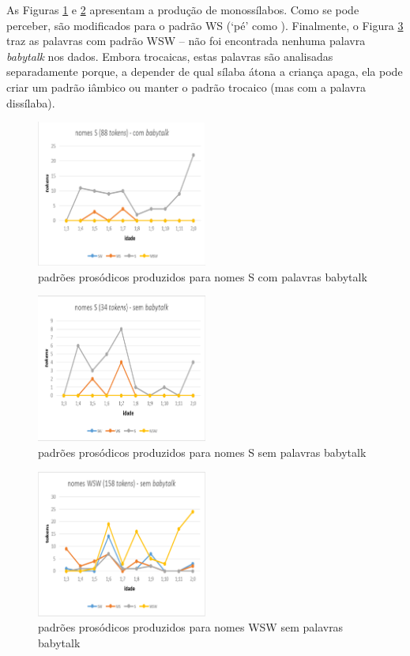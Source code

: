 \documentclass[output=paper]{LSP/langsci}
\begin{document}
As Figuras \ref{fig:santana_5} e \ref{fig:santana_6} apresentam a produção de monossílabos. Como se pode perceber, são modificados para o padrão WS (`pé' como \ipa{[ti\pstr pa]}). Finalmente, o Figura \ref{fig:santana_7} traz as palavras com padrão WSW – não foi encontrada nenhuma palavra \textit{babytalk} nos dados. Embora trocaicas, estas palavras são analisadas separadamente porque, a depender de qual sílaba átona a criança apaga, ela pode criar um padrão iâmbico ou manter o padrão trocaico (mas com a palavra dissílaba).

\begin{figure}
\includegraphics[width=0.5\textwidth]{figures/santanafig5}
\caption{padrões prosódicos produzidos para nomes S com palavras babytalk}
\label{fig:santana_5}
\end{figure}

\begin{figure}
\includegraphics[width=0.5\textwidth]{figures/santanafig6}
\caption{padrões prosódicos produzidos para nomes S sem palavras babytalk}
\label{fig:santana_6}
\end{figure}

\begin{figure}
\includegraphics[width=0.5\textwidth]{figures/santanafig7}
\caption{padrões prosódicos produzidos para nomes WSW sem palavras babytalk}
\label{fig:santana_7}
\end{figure}
\end{document}
